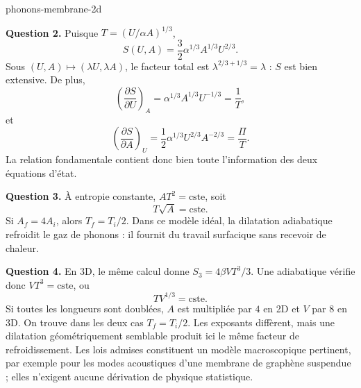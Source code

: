 \begin{exo}{phonons-membrane-2d}
\begin{solution}
\textbf{Question 2.} Puisque $T=(U/\alpha A)^{1/3}$,
\[
\boxed{S(U,A)=\frac{3}{2}\alpha^{1/3}A^{1/3}U^{2/3}.}
\]
Sous $(U,A)\mapsto(\lambda U,\lambda A)$, le facteur total est $\lambda^{2/3+1/3}=\lambda$ : $S$ est bien extensive. De plus,
\[
\left(\frac{\partial S}{\partial U}\right)_A
=\alpha^{1/3}A^{1/3}U^{-1/3}=\frac1T,
\]
et
\[
\left(\frac{\partial S}{\partial A}\right)_U
=\frac12\alpha^{1/3}U^{2/3}A^{-2/3}
=\frac{\Pi}{T}.
\]
La relation fondamentale contient donc bien toute l'information des deux équations d'état.

\textbf{Question 3.} À entropie constante, $AT^2=\text{cste}$, soit
\[
\boxed{T\sqrt A=\text{cste}.}
\]
Si $A_f=4A_i$, alors $T_f=T_i/2$. Dans ce modèle idéal, la dilatation adiabatique refroidit le gaz de phonons : il fournit du travail surfacique sans recevoir de chaleur.

\textbf{Question 4.} En 3D, le même calcul donne $S_3=4\beta VT^3/3$. Une adiabatique vérifie donc $VT^3=\text{cste}$, ou
\[
\boxed{TV^{1/3}=\text{cste}.}
\]
Si toutes les longueurs sont doublées, $A$ est multipliée par $4$ en 2D et $V$ par $8$ en 3D. On trouve dans les deux cas $T_f=T_i/2$. Les exposants diffèrent, mais une dilatation géométriquement semblable produit ici le même facteur de refroidissement. Les lois admises constituent un modèle macroscopique pertinent, par exemple pour les modes acoustiques d'une membrane de graphène suspendue ; elles n'exigent aucune dérivation de physique statistique.
\end{solution}
\end{exo}

